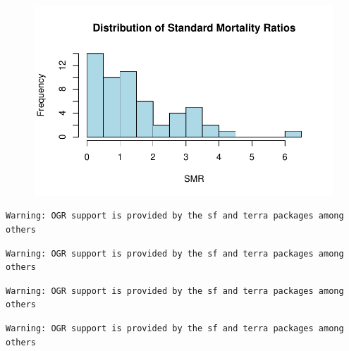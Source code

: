 \documentclass[
  letterpaper,
  DIV=11,
  numbers=noendperiod]{scrartcl}
\newenvironment{Shaded}{\begin{snugshade}}{\end{snugshade}}
\newcommand{\AttributeTok}[1]{\textcolor[rgb]{0.40,0.45,0.13}{#1}}
\newcommand{\CommentTok}[1]{\textcolor[rgb]{0.37,0.37,0.37}{#1}}
\newcommand{\FunctionTok}[1]{\textcolor[rgb]{0.28,0.35,0.67}{#1}}
\newcommand{\NormalTok}[1]{\textcolor[rgb]{0.00,0.23,0.31}{#1}}
\newcommand{\OtherTok}[1]{\textcolor[rgb]{0.00,0.23,0.31}{#1}}
\newcommand{\SpecialCharTok}[1]{\textcolor[rgb]{0.37,0.37,0.37}{#1}}
\newcommand{\StringTok}[1]{\textcolor[rgb]{0.13,0.47,0.30}{#1}}
\begin{document}
\begin{figure}[H]

{\centering \includegraphics{AssignmentAdvancedTopicsInStatistics_files/figure-pdf/unnamed-chunk-4-1.pdf}

}

\end{figure}

\begin{Shaded}
\end{Shaded}

\begin{verbatim}
Warning: OGR support is provided by the sf and terra packages among others
\end{verbatim}

\begin{verbatim}
Warning: OGR support is provided by the sf and terra packages among others
\end{verbatim}

\begin{verbatim}
Warning: OGR support is provided by the sf and terra packages among others
\end{verbatim}

\begin{verbatim}
Warning: OGR support is provided by the sf and terra packages among others
\end{verbatim}
\end{document}
